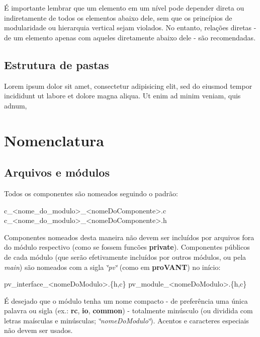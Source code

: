 É importante lembrar que um elemento em um nível pode depender direta ou indiretamente de todos os elementos abaixo dele, sem que os princípios de modularidade ou hierarquia vertical sejam violados. No entanto, relações diretas -\/ de um elemento apenas com aqueles diretamente abaixo dele -\/ são recomendadas.\hypertarget{page_naming_page_naming_subsec_foldertree}{}\subsection{Estrutura de pastas}\label{page_naming_page_naming_subsec_foldertree}
Lorem ipsum dolor sit amet, consectetur adipisicing elit, sed do eiusmod tempor incididunt ut labore et dolore magna aliqua. Ut enim ad minim veniam, quis adnum,\hypertarget{page_naming_page_naming_sec_naming}{}\section{Nomenclatura}\label{page_naming_page_naming_sec_naming}
\hypertarget{page_naming_page_naming_subsec_filenaming}{}\subsection{Arquivos e módulos}\label{page_naming_page_naming_subsec_filenaming}
Todos os componentes são nomeados seguindo o padrão\-:


\begin{DoxyCode}
c\_<nome\_do\_modulo>\_<nomeDoComponente>.c
c\_<nome\_do\_modulo>\_<nomeDoComponente>.h 
\end{DoxyCode}


Componentes nomeados desta maneira não devem ser incluídos por arquivos fora do módulo respectivo (como se fossem funcões {\bfseries private}). Componentes públicos de cada módulo (que serão efetivamente incluídos por outros módulos, ou pela {\itshape main}) são nomeados com a sigla {\itshape \char`\"{}pv\char`\"{}} (como em {\bfseries pro\-V\-A\-N\-T}) no início\-:


\begin{DoxyCode}
pv\_interface\_<nomeDoModulo>.\{h,c\}
pv\_module\_<nomeDoModulo>.\{h,c\} 
\end{DoxyCode}


É desejado que o módulo tenha um nome compacto -\/ de preferência uma única palavra ou sigla (ex.\-: {\bfseries rc}, {\bfseries io}, {\bfseries common}) -\/ totalmente minúsculo (ou dividida com letras maísculas e minúsculas; {\itshape \char`\"{}nome\-Do\-Modulo\char`\"{}}). Acentos e caracteres especiais não devem ser usados.

